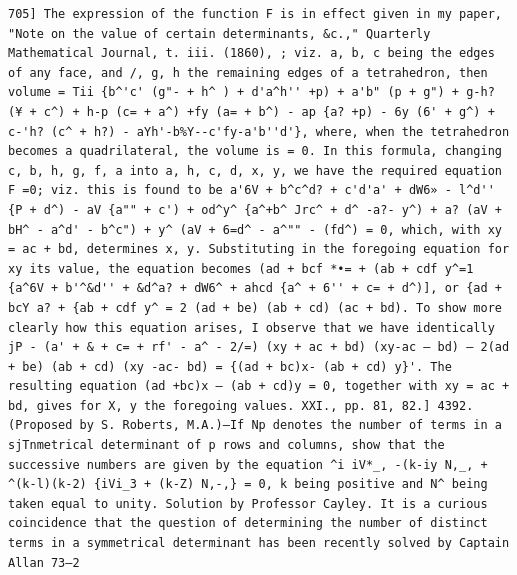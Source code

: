 \documentclass[12pt]{article}
\theoremstyle{plain}
\begin{document}
\newpage
\setcounter{page}{579}
\begin{verbatim}
705] The expression of the function F is in effect given in my paper, "Note on the value of certain determinants, &c.," Quarterly Mathematical Journal, t. iii. (1860), ; viz. a, b, c being the edges of any face, and /, g, h the remaining edges of a tetrahedron, then volume = Tii {b^'c' (g"- + h^ ) + d'a^h'' +p) + a'b" (p + g") + g-h? (¥ + c^) + h-p (c= + a^) +fy (a= + b^) - ap {a? +p) - 6y (6' + g^) + c-'h? (c^ + h?) - aYh'-b%Y--c'fy-a'b''d'}, where, when the tetrahedron becomes a quadrilateral, the volume is = 0. In this formula, changing c, b, h, g, f, a into a, h, c, d, x, y, we have the required equation F =0; viz. this is found to be a'6V + b^c^d? + c'd'a' + dW6» - l^d'' {P + d^) - aV {a"" + c') + od^y^ {a^+b^ Jrc^ + d^ -a?- y^) + a? (aV + bH^ - a^d' - b^c") + y^ (aV + 6=d^ - a^"" - (fd^) = 0, which, with xy = ac + bd, determines x, y. Substituting in the foregoing equation for xy its value, the equation becomes (ad + bcf *•= + (ab + cdf y^=1 {a^6V + b'^&d'' + &d^a? + dW6^ + ahcd {a^ + 6'' + c= + d^)], or {ad + bcY a? + {ab + cdf y^ = 2 (ad + be) (ab + cd) (ac + bd). To show more clearly how this equation arises, I observe that we have identically jP - (a' + & + c= + rf' - a^ - 2/=) (xy + ac + bd) (xy-ac — bd) — 2(ad + be) (ab + cd) (xy -ac- bd) = {(ad + bc)x- (ab + cd) y}'. The resulting equation (ad +bc)x — (ab + cd)y = 0, together with xy = ac + bd, gives for X, y the foregoing values. XXI., pp. 81, 82.] 4392. (Proposed by S. Roberts, M.A.)—If Np denotes the number of terms in a sjTnmetrical determinant of p rows and columns, show that the successive numbers are given by the equation ^i iV*_, -(k-iy N,_, + ^(k-l)(k-2) {iVi_3 + (k-Z) N,-,} = 0, k being positive and N^ being taken equal to unity. Solution by Professor Cayley. It is a curious coincidence that the question of determining the number of distinct terms in a symmetrical determinant has been recently solved by Captain Allan 73—2 
\end{verbatim}
\end{document}
